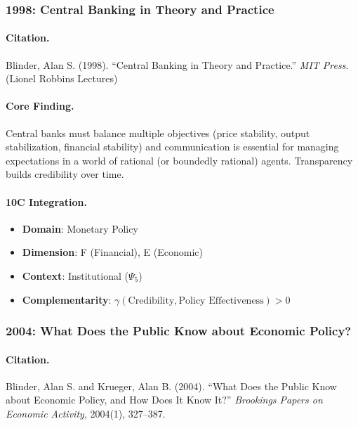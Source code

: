 \subsubsection{1998: Central Banking in Theory and Practice}

\paragraph{Citation.}
Blinder, Alan S. (1998). ``Central Banking in Theory and Practice.''
\textit{MIT Press}. (Lionel Robbins Lectures)

\paragraph{Core Finding.}
Central banks must balance multiple objectives (price stability, output stabilization,
financial stability) and communication is essential for managing expectations in a world
of rational (or boundedly rational) agents. Transparency builds credibility over time.

\paragraph{10C Integration.}
\begin{itemize}[nosep]
  \item \textbf{Domain}: Monetary Policy
  \item \textbf{Dimension}: F (Financial), E (Economic)
  \item \textbf{Context}: Institutional ($\Psi_5$)
  \item \textbf{Complementarity}: $\gamma(\text{Credibility}, \text{Policy Effectiveness}) > 0$
\end{itemize}

\subsubsection{2004: What Does the Public Know about Economic Policy?}

\paragraph{Citation.}
Blinder, Alan S. and Krueger, Alan B. (2004).
``What Does the Public Know about Economic Policy, and How Does It Know It?''
\textit{Brookings Papers on Economic Activity}, 2004(1), 327--387.

